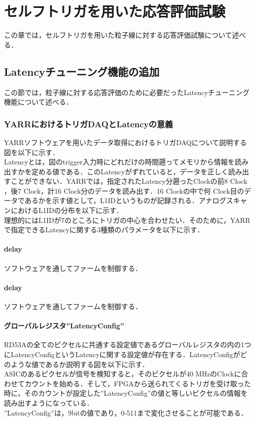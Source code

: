 \chapter{セルフトリガを用いた応答評価試験}
この章では，セルフトリガを用いた粒子線に対する応答評価試験について述べる．

\section{Latencyチューニング機能の追加}
この節では，粒子線に対する応答評価のために必要だったLatencyチューニング機能について述べる．
\subsection{YARRにおけるトリガDAQとLatencyの意義}
YARRソフトウェアを用いたデータ取得におけるトリガDAQについて説明する図を以下に示す．\\
Latencyとは，図のtrigger入力時にどれだけの時間遡ってメモリから情報を読み出すかを定める値である．このLatencyがずれていると，データを正しく読み出すことができない．YARRでは，指定されたLatency分遡ったClockの前8 $\mathrm{Clock}$，後7 $\mathrm{Clock}$，計16 $\mathrm{Clock}$分のデータを読み出す．16 $\mathrm{Clock}$の中で何 $\mathrm{Clock}$目のデータであるかを示す値として，L1IDというものが記録される．アナログスキャンにおけるL1IDの分布を以下に示す．\\
理想的にはL1IDが7のところにトリガの中心を合わせたい．そのために，YARRで指定できるLatencyに関する3種類のパラメータを以下に示す．
\subsubsection{delay}
ソフトウェアを通してファームを制御する．
\subsubsection{delay}
ソフトウェアを通してファームを制御する．
\subsubsection{グローバルレジスタ''LatencyConfig''}
RD53Aの全てのピクセルに共通する設定値であるグローバルレジスタの内の1つにLatencyConfigというLatencyに関する設定値が存在する．LatencyConfigがどのような値であるか説明する図を以下に示す．\\
ASICのあるピクセルが信号を検知すると，そのピクセルが40 $\mathrm{MHz}$のClockに合わせてカウントを始める．そして，FPGAから送られてくるトリガを受け取った時に，そのカウントが設定した''LatencyConfig''の値と等しいピクセルの情報を読み出すようになっている．\\
''LatencyConfig''は，9bitの値であり，0-511まで変化させることが可能である．


